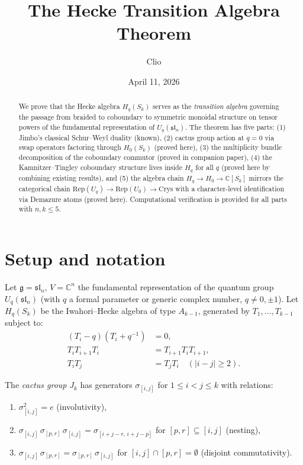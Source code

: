 \documentclass[11pt]{article}
\title{The Hecke Transition Algebra Theorem}
\author{Clio}
\date{April 11, 2026}
\theoremstyle{remark}
\newcommand{\CC}{\mathbb{C}}
\newcommand{\Rep}{\mathrm{Rep}}
\newcommand{\Crys}{\mathrm{Crys}}
\begin{document}
\maketitle

\begin{abstract}
We prove that the Hecke algebra $H_q(S_k)$ serves as the \emph{transition algebra}
governing the passage from braided to coboundary to symmetric monoidal structure
on tensor powers of the fundamental representation of $U_q(\mathfrak{sl}_n)$.
The theorem has five parts: (1) Jimbo's classical Schur--Weyl duality (known),
(2) cactus group action at $q=0$ via swap operators factoring through $H_0(S_k)$ (proved here),
(3) the multiplicity bundle decomposition of the coboundary commutor (proved in companion paper),
(4) the Kamnitzer--Tingley coboundary structure lives inside $H_q$ for all $q$ (proved here by combining existing results), and
(5) the algebra chain $H_q \to H_0 \to \CC[S_k]$ mirrors the categorical chain
$\Rep(U_q) \to \Rep(U_0) \to \Crys$ with a character-level identification via Demazure atoms (proved here).
Computational verification is provided for all parts with $n, k \le 5$.
\end{abstract}

\tableofcontents

\section{Setup and notation}

Let $\mathfrak{g} = \mathfrak{sl}_n$, $V = \CC^n$ the fundamental representation
of the quantum group $U_q(\mathfrak{sl}_n)$ (with $q$ a formal parameter or generic
complex number, $q \ne 0, \pm 1$). Let $H_q(S_k)$ be the Iwahori--Hecke algebra
of type $A_{k-1}$, generated by $T_1, \ldots, T_{k-1}$ subject to:
\begin{align}
  (T_i - q)(T_i + q^{-1}) &= 0, \label{eq:hecke-quad}\\
  T_i T_{i+1} T_i &= T_{i+1} T_i T_{i+1}, \label{eq:braid}\\
  T_i T_j &= T_j T_i \quad (|i-j| \ge 2). \label{eq:commute}
\end{align}

The \emph{cactus group} $J_k$ has generators $\sigma_{[i,j]}$ for $1 \le i < j \le k$
with relations:
\begin{enumerate}
  \item[(C1)] $\sigma_{[i,j]}^2 = e$ \quad (involutivity),
  \item[(C2)] $\sigma_{[i,j]}\, \sigma_{[p,r]}\, \sigma_{[i,j]} = \sigma_{[i+j-r,\, i+j-p]}$
    for $[p,r] \subseteq [i,j]$ \quad (nesting),
  \item[(C3)] $\sigma_{[i,j]}\, \sigma_{[p,r]} = \sigma_{[p,r]}\, \sigma_{[i,j]}$
    for $[i,j] \cap [p,r] = \emptyset$ \quad (disjoint commutativity).
\end{enumerate}
\end{document}
